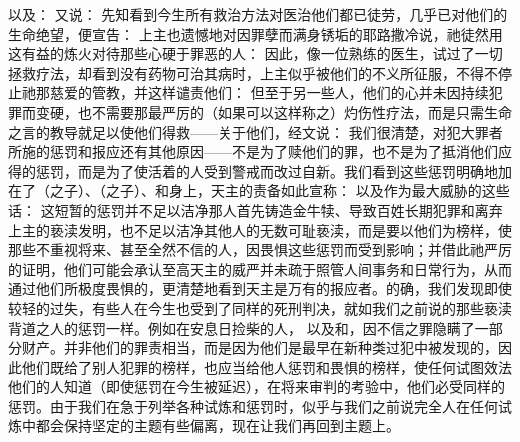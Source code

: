 以及： 又说： 先知看到今生所有救治方法对医治他们都已徒劳，几乎已对他们的生命绝望，便宣告： 上主也遗憾地对因罪孽而满身锈垢的耶路撒冷说，祂徒然用这有益的炼火对待那些心硬于罪恶的人： 因此，像一位熟练的医生，试过了一切拯救疗法，却看到没有药物可治其病时，上主似乎被他们的不义所征服，不得不停止祂那慈爱的管教，并这样谴责他们： 但至于另一些人，他们的心并未因持续犯罪而变硬，也不需要那最严厉的（如果可以这样称之）灼伤性疗法，而是只需生命之言的教导就足以使他们得救——关于他们，经文说： 我们很清楚，对犯大罪者所施的惩罚和报应还有其他原因——不是为了赎他们的罪，也不是为了抵消他们应得的惩罚，而是为了使活着的人受到警戒而改过自新。我们看到这些惩罚明确地加在了（之子）、（之子）、和身上，天主的责备如此宣称： 以及作为最大威胁的这些话： 这短暂的惩罚并不足以洁净那人首先铸造金牛犊、导致百姓长期犯罪和离弃上主的亵渎发明，也不足以洁净其他人的无数可耻亵渎，而是要以他们为榜样，使那些不重视将来、甚至全然不信的人，因畏惧这些惩罚而受到影响；并借此祂严厉的证明，他们可能会承认至高天主的威严并未疏于照管人间事务和日常行为，从而通过他们所极度畏惧的，更清楚地看到天主是万有的报应者。的确，我们发现即使较轻的过失，有些人在今生也受到了同样的死刑判决，就如我们之前说的那些亵渎背道之人的惩罚一样。例如在安息日捡柴的人， 以及和，因不信之罪隐瞒了一部分财产。并非他们的罪责相当，而是因为他们是最早在新种类过犯中被发现的，因此他们既给了别人犯罪的榜样，也应当给他人惩罚和畏惧的榜样，使任何试图效法他们的人知道（即使惩罚在今生被延迟），在将来审判的考验中，他们必受同样的惩罚。由于我们在急于列举各种试炼和惩罚时，似乎与我们之前说完全人在任何试炼中都会保持坚定的主题有些偏离，现在让我们再回到主题上。\par

